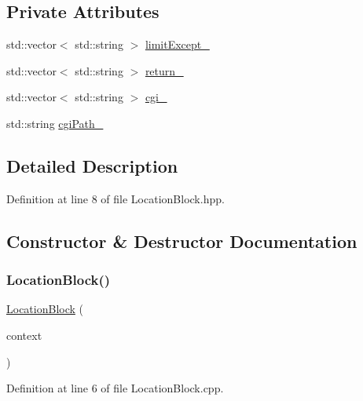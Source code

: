 \subsection*{Private Attributes}
\begin{DoxyCompactItemize}
\item 
std\+::vector$<$ std\+::string $>$ \hyperlink{classft_1_1_location_block_a8fec53119566b5654a7b902a1c53c6d9}{limit\+Except\+\_\+}
\item 
std\+::vector$<$ std\+::string $>$ \hyperlink{classft_1_1_location_block_abab721f365aff66f8a1289de21c8f01f}{return\+\_\+}
\item 
std\+::vector$<$ std\+::string $>$ \hyperlink{classft_1_1_location_block_a1952859864bec449ee1a20b4e90f829a}{cgi\+\_\+}
\item 
std\+::string \hyperlink{classft_1_1_location_block_a88189428cc92093d70626539b8851f5f}{cgi\+Path\+\_\+}
\end{DoxyCompactItemize}


\subsection{Detailed Description}


Definition at line 8 of file Location\+Block.\+hpp.



\subsection{Constructor \& Destructor Documentation}
\mbox{\label{classft_1_1_location_block_a28cbc9fd5dfde06685c8f7be5b6e0a4a}} 
\subsubsection{\texorpdfstring{Location\+Block()}{LocationBlock()}}
{\footnotesize\ttfamily \hyperlink{classft_1_1_location_block}{Location\+Block} (\begin{DoxyParamCaption}\item[{const \hyperlink{classft_1_1_base_directives}{Base\+Directives} \&}]{context }\end{DoxyParamCaption})}



Definition at line 6 of file Location\+Block.\+cpp.



